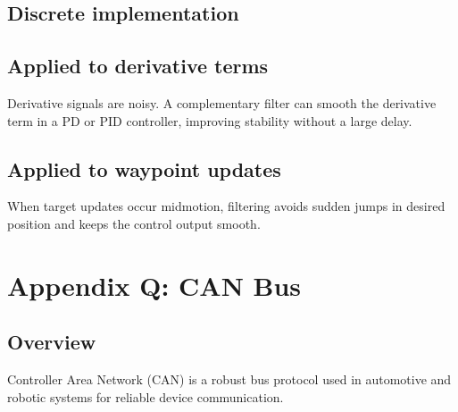 \documentclass[letterpaper,10pt,english]{sphinxmanual}
\begin{document}
\section{Discrete implementation}
\label{\detokenize{appendix_p_complementary_filtering:discrete-implementation}}
\begin{sphinxVerbatim}[commandchars=\\\{\}]
          
\end{sphinxVerbatim}


\section{Applied to derivative terms}
\label{\detokenize{appendix_p_complementary_filtering:applied-to-derivative-terms}}
\sphinxAtStartPar
Derivative signals are noisy. A complementary filter can smooth the derivative
term in a PD or PID controller, improving stability without a large delay.


\section{Applied to waypoint updates}
\label{\detokenize{appendix_p_complementary_filtering:applied-to-waypoint-updates}}
\sphinxAtStartPar
When target updates occur mid\sphinxhyphen{}motion, filtering avoids sudden jumps in desired
position and keeps the control output smooth.


\chapter{Appendix Q: CAN Bus}
\label{\detokenize{appendix_q_can_bus:appendix-q-can-bus}}\label{\detokenize{appendix_q_can_bus::doc}}

\section{Overview}
\label{\detokenize{appendix_q_can_bus:overview}}
\sphinxAtStartPar
Controller Area Network (CAN) is a robust bus protocol used in automotive and
robotic systems for reliable device communication.
\end{document}
